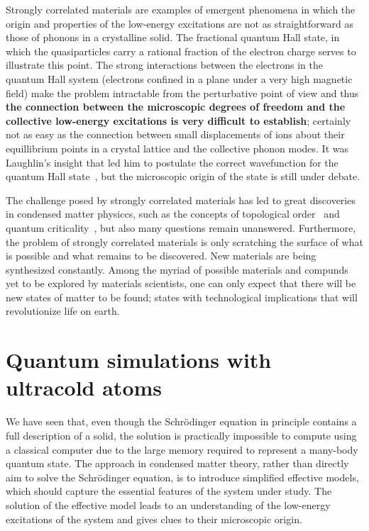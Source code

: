 \documentclass[oneside,11pt]{memoir}
\begin{document}
Strongly correlated materials are examples of emergent phenomena in which
the origin and properties of the low-energy excitations are not as
straightforward as those of phonons in a crystalline solid.  The fractional
quantum Hall state, in which the quasiparticles carry a rational fraction of
the electron charge serves to illustrate this point.  The strong
interactions between the electrons in the quantum Hall system (electrons
confined in a plane under a very high magnetic field) make the problem
intractable from the perturbative point of view and thus \textbf{the connection
between the microscopic degrees of freedom and the collective low-energy
excitations is very difficult to establish}; certainly not as easy as the
connection between small displacements of ions about their equillibrium points in
a crystal lattice and the collective phonon modes. It was Laughlin's
insight that led him to postulate the correct wavefunction  for the quantum
Hall state~\cite{PhysRevLett.50.1395}, but the microscopic origin of the state
is still under debate.   

The challenge posed by strongly correlated materials has led to great
discoveries in condensed matter physiccs, such as the concepts of topological
order~\cite{wen1990topological} and quantum
criticality~\cite{PhysRevB.14.1165,sachdev2011quantum}, but also many questions
remain unanswered.  Furthermore, the problem of strongly correlated materials
is only scratching the surface of what is possible and what remains to be
discovered.  New materials are being synthesized constantly.  Among the
myriad of possible materials and compunds yet to be explored by
materials scientists, one can only expect that there will be new states of
matter to be found; states with technological implications that will
revolutionize life on earth.  


\section{Quantum simulations with ultracold atoms}

We have seen that, even though the Schr\"{o}dinger equation in principle
contains a full description of a solid,  the solution is practically impossible
to compute using a classical computer due to the large memory required to
represent a many-body quantum state.   
The approach in condensed matter theory, rather than directly aim to solve the
Schr\"{o}dinger equation, is to introduce simplified effective models, which
should capture the essential features of the system under study.  The solution
of the effective model leads to an understanding of the low-energy excitations
of the system and gives clues to their microscopic origin.   
\end{document}
